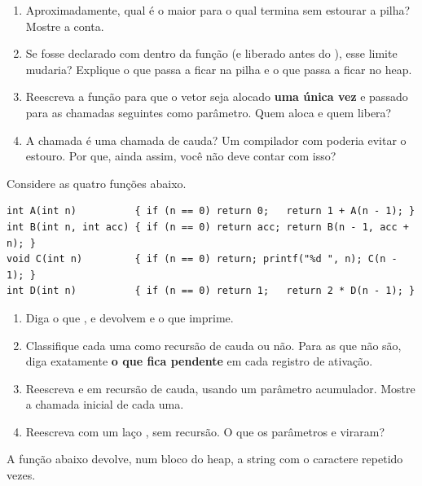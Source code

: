 \documentclass[11pt,a4paper]{article}
\begin{document}
\begin{enumerate}[label=(\alph*),leftmargin=1.8em,itemsep=1pt]
  \item Aproximadamente, qual é o maior  para o qual  termina
        sem estourar a pilha? Mostre a conta.
  \item Se  fosse declarado com  dentro da função (e
        liberado antes do ), esse limite mudaria? Explique o que passa a
        ficar na pilha e o que passa a ficar no heap.
  \item Reescreva a função para que o vetor seja alocado \textbf{uma única vez} e
        passado para as chamadas seguintes como parâmetro. Quem aloca e quem libera?
  \item A chamada  é uma chamada de cauda? Um compilador com
         poderia evitar o estouro. Por que, ainda assim, você não deve
        contar com isso?
\end{enumerate}

Considere as quatro funções abaixo.

\begin{lstlisting}
int A(int n)          { if (n == 0) return 0;   return 1 + A(n - 1); }
int B(int n, int acc) { if (n == 0) return acc; return B(n - 1, acc + n); }
void C(int n)         { if (n == 0) return; printf("%d ", n); C(n - 1); }
int D(int n)          { if (n == 0) return 1;   return 2 * D(n - 1); }
\end{lstlisting}

\begin{enumerate}[label=(\alph*),leftmargin=1.8em,itemsep=1pt]
  \item Diga o que ,  e  devolvem e o que 
        imprime.
  \item Classifique cada uma como recursão de cauda ou não. Para as que não são,
        diga exatamente \textbf{o que fica pendente} em cada registro de ativação.
  \item Reescreva  e  em recursão de cauda, usando um parâmetro
        acumulador. Mostre a chamada inicial de cada uma.
  \item Reescreva  com um laço , sem recursão. O que os parâmetros
         e  viraram?
\end{enumerate}

A função abaixo devolve, num bloco do heap, a string com o caractere  repetido
 vezes.
\end{document}
